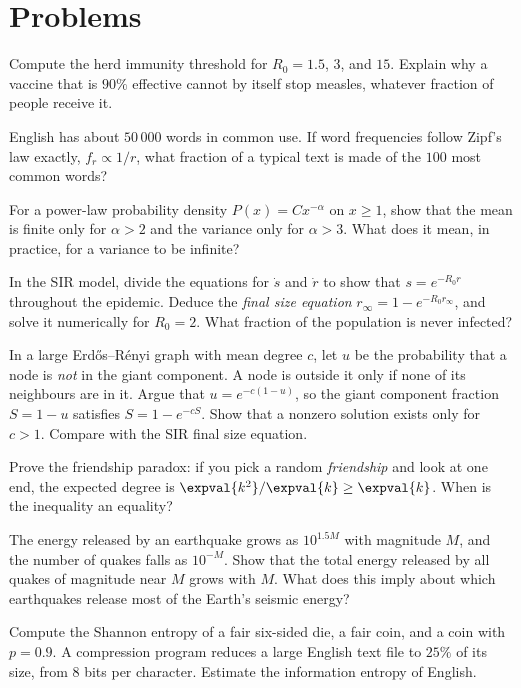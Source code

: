 \section{Problems}

\begin{problems}
\core Compute the herd immunity threshold for $R_0 = 1.5$, $3$, and $15$. Explain why a vaccine that is $90\%$ effective cannot by itself stop measles, whatever fraction of people receive it.

 English has about $50\,000$ words in common use. If word frequencies follow Zipf's law exactly, $f_r\propto1/r$, what fraction of a typical text is made of the $100$ most common words?

 For a power-law probability density $P(x) = Cx^{-\alpha}$ on $x\ge1$, show that the mean is finite only for $\alpha>2$ and the variance only for $\alpha>3$. What does it mean, in practice, for a variance to be infinite?

\core In the SIR model, divide the equations for $\dot s$ and $\dot r$ to show that $s = e^{-R_0r}$ throughout the epidemic. Deduce the \emph{final size equation} $r_\infty = 1 - e^{-R_0r_\infty}$, and solve it numerically for $R_0 = 2$. What fraction of the population is never infected?

\core \label{prob:giant} In a large Erd\H{o}s--R\'enyi graph with mean degree $c$, let $u$ be the probability that a node is \emph{not} in the giant component. A node is outside it only if none of its neighbours are in it. Argue that $u = e^{-c(1-u)}$, so the giant component fraction $S = 1-u$ satisfies $S = 1 - e^{-cS}$. Show that a nonzero solution exists only for $c>1$. Compare with the SIR final size equation.

 Prove the friendship paradox: if you pick a random \emph{friendship} and look at one end, the expected degree is $\expval{k^2}/\expval{k}\ge\expval{k}$. When is the inequality an equality?

 The energy released by an earthquake grows as $10^{1.5M}$ with magnitude $M$, and the number of quakes falls as $10^{-M}$. Show that the total energy released by all quakes of magnitude near $M$ grows with $M$. What does this imply about which earthquakes release most of the Earth's seismic energy?

 Compute the Shannon entropy of a fair six-sided die, a fair coin, and a coin with $p = 0.9$. A compression program reduces a large English text file to $25\%$ of its size, from $8$ bits per character. Estimate the information entropy of English.


\end{problems}
